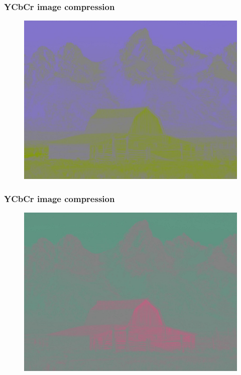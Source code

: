 \documentclass{beamer}
\begin{document}
\begin{frame}
\frametitle{YCbCr image compression}
    \begin{figure}[htb]
    \includegraphics[scale=0.3]{YCbCr-cb.jpg}
    \end{figure}
\end{frame}

\begin{frame}
\frametitle{YCbCr image compression}
    \begin{figure}[htb]
    \includegraphics[scale=0.3]{YCbCr-cr.jpg}
    \end{figure}
\end{frame}
\end{document}
